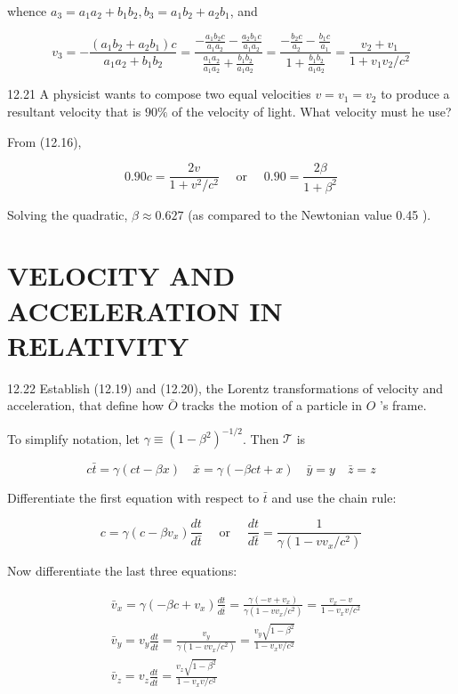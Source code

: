 \documentclass[10pt]{article}
\begin{document}
whence $a_{3}=a_{1} a_{2}+b_{1} b_{2}, b_{3}=a_{1} b_{2}+a_{2} b_{1}$, and

$$
v_{3}=-\frac{\left(a_{1} b_{2}+a_{2} b_{1}\right) c}{a_{1} a_{2}+b_{1} b_{2}}=\frac{-\frac{a_{1} b_{2} c}{a_{1} a_{2}}-\frac{a_{2} b_{1} c}{a_{1} a_{2}}}{\frac{a_{1} a_{2}}{a_{1} a_{2}}+\frac{b_{1} b_{2}}{a_{1} a_{2}}}=\frac{-\frac{b_{2} c}{a_{2}}-\frac{b_{1} c}{a_{1}}}{1+\frac{b_{1} b_{2}}{a_{1} a_{2}}}=\frac{v_{2}+v_{1}}{1+v_{1} v_{2} / c^{2}}
$$

12.21 A physicist wants to compose two equal velocities $v=v_{1}=v_{2}$ to produce a resultant velocity that is $90 \%$ of the velocity of light. What velocity must he use?

From (12.16),

$$
0.90 c=\frac{2 v}{1+v^{2} / c^{2}} \quad \text { or } \quad 0.90=\frac{2 \beta}{1+\beta^{2}}
$$

Solving the quadratic, $\beta \approx 0.627$ (as compared to the Newtonian value 0.45 ).

\section*{VELOCITY AND ACCELERATION IN RELATIVITY}
12.22 Establish (12.19) and (12.20), the Lorentz transformations of velocity and acceleration, that define how $\bar{O}$ tracks the motion of a particle in $O$ 's frame.

To simplify notation, let $\gamma \equiv\left(1-\beta^{2}\right)^{-1 / 2}$. Then $\mathscr{T}$ is

$$
c \bar{t}=\gamma(c t-\beta x) \quad \bar{x}=\gamma(-\beta c t+x) \quad \bar{y}=y \quad \bar{z}=z
$$

Differentiate the first equation with respect to $\bar{t}$ and use the chain rule:

$$
c=\gamma\left(c-\beta v_{x}\right) \frac{d t}{d \bar{t}} \quad \text { or } \quad \frac{d t}{d \bar{t}}=\frac{1}{\gamma\left(1-v v_{x} / c^{2}\right)}
$$

Now differentiate the last three equations:

$$
\begin{aligned}
& \bar{v}_{x}=\gamma\left(-\beta c+v_{x}\right) \frac{d t}{d \bar{t}}=\frac{\gamma\left(-v+v_{x}\right)}{\gamma\left(1-v v_{x} / c^{2}\right)}=\frac{v_{x}-v}{1-v_{x} v / c^{2}} \\
& \bar{v}_{y}=v_{y} \frac{d t}{d \bar{t}}=\frac{v_{y}}{\gamma\left(1-v v_{x} / c^{2}\right)}=\frac{v_{y} \sqrt{1-\beta^{2}}}{1-v_{x} v / c^{2}} \\
& \bar{v}_{z}=v_{z} \frac{d t}{d \bar{t}}=\frac{v_{z} \sqrt{1-\beta^{2}}}{1-v_{x} v / c^{2}}
\end{aligned}
$$
\end{document}
